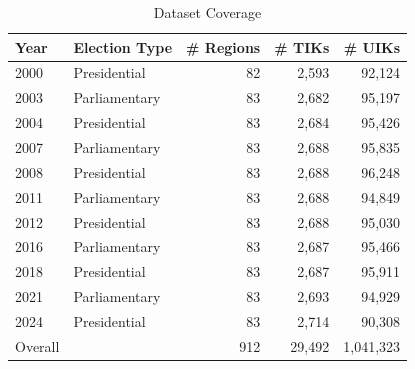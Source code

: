 \begin{table}[ht]
\centering
\begin{tabular}{llrrr}
  \hline
Year & Election Type & \# Regions & \# TIKs & \# UIKs \\ 
  \hline
2000 & Presidential & 82 & 2,593 & 92,124 \\ 
  2003 & Parliamentary & 83 & 2,682 & 95,197 \\ 
  2004 & Presidential & 83 & 2,684 & 95,426 \\ 
  2007 & Parliamentary & 83 & 2,688 & 95,835 \\ 
  2008 & Presidential & 83 & 2,688 & 96,248 \\ 
  2011 & Parliamentary & 83 & 2,688 & 94,849 \\ 
  2012 & Presidential & 83 & 2,688 & 95,030 \\ 
  2016 & Parliamentary & 83 & 2,687 & 95,466 \\ 
  2018 & Presidential & 83 & 2,687 & 95,911 \\ 
  2021 & Parliamentary & 83 & 2,693 & 94,929 \\ 
  2024 & Presidential & 83 & 2,714 & 90,308 \\ 
  Overall &  & 912 & 29,492 & 1,041,323 \\ 
   \hline
\end{tabular}
\caption{Dataset Coverage} 
\label{tab:coverage}
\end{table}
